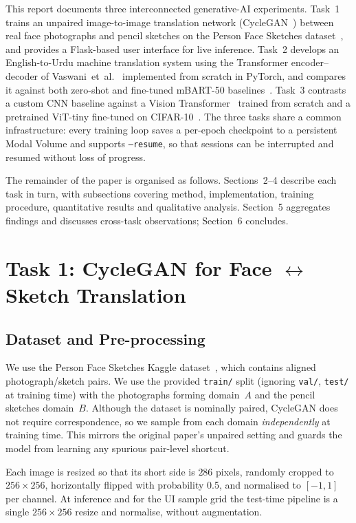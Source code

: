 \documentclass[runningheads]{llncs}
\begin{document}
This report documents three interconnected generative-AI experiments.
Task~1 trains an unpaired image-to-image translation network
(CycleGAN~\cite{cyclegan}) between real face photographs and pencil
sketches on the Person Face Sketches
dataset~\cite{personfacesketches}, and provides a Flask-based user
interface for live inference. Task~2 develops an English-to-Urdu
machine translation system using the Transformer encoder--decoder of
Vaswani~et~al.~\cite{vaswani} implemented from scratch in PyTorch, and
compares it against both zero-shot and fine-tuned mBART-50
baselines~\cite{mbart}. Task~3 contrasts a custom CNN baseline against
a Vision Transformer~\cite{vit} trained from scratch and a pretrained
ViT-tiny fine-tuned on CIFAR-10~\cite{cifar10}. The three tasks share a
common infrastructure: every training loop saves a per-epoch checkpoint
to a persistent Modal Volume and supports \texttt{--resume}, so that
sessions can be interrupted and resumed without loss of progress.

The remainder of the paper is organised as follows. Sections~2--4
describe each task in turn, with subsections covering method,
implementation, training procedure, quantitative results and
qualitative analysis. Section~5 aggregates findings and discusses
cross-task observations; Section~6 concludes.

\section{Task 1: CycleGAN for Face $\leftrightarrow$ Sketch Translation}

\subsection{Dataset and Pre-processing}

We use the Person Face Sketches Kaggle dataset~\cite{personfacesketches},
which contains aligned photograph/sketch pairs. We use the provided
\texttt{train/} split (ignoring \texttt{val/}, \texttt{test/} at
training time) with the photographs forming domain~$A$ and the pencil
sketches domain~$B$. Although the dataset is nominally paired, CycleGAN
does not require correspondence, so we sample from each domain
\emph{independently} at training time. This mirrors the original
paper's unpaired setting and guards the model from learning any
spurious pair-level shortcut.

Each image is resized so that its short side is $286$ pixels, randomly
cropped to $256 \times 256$, horizontally flipped with probability 0.5,
and normalised to $[-1, 1]$ per channel. At inference and for the UI
sample grid the test-time pipeline is a single $256 \times 256$
resize and normalise, without augmentation.
\end{document}
